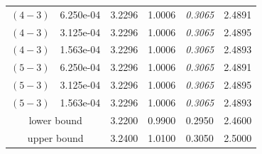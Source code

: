 \begin{table}[h!]
\begin{tabular} {cccccc}
		\midrule
			$(4-3)$ & 6.250e-04 & 3.2296 & 1.0006 & \textit{0.3065} & 2.4891 \\ 
			$(4-3)$ & 3.125e-04 & 3.2296 & 1.0006 & \textit{0.3065} & 2.4895 \\ 
			$(4-3)$ & 1.563e-04 & 3.2296 & 1.0006 & \textit{0.3065} & 2.4893 \\ 
		\midrule
			$(5-3)$ & 6.250e-04 & 3.2296 & 1.0006 & \textit{0.3065} & 2.4891 \\ 
			$(5-3)$ & 3.125e-04 & 3.2296 & 1.0006 & \textit{0.3065} & 2.4895 \\ 
			$(5-3)$ & 1.563e-04 & 3.2296 & 1.0006 & \textit{0.3065} & 2.4893 \\ 
		\midrule
		\midrule
			\multicolumn{2}{c}{lower bound} & 3.2200 & 0.9900 & 0.2950 & 2.4600 \\
			\multicolumn{2}{c}{upper bound} & 3.2400 & 1.0100 & 0.3050 & 2.5000 \\
		\bottomrule
	\end{tabular}
\end{table}

%

